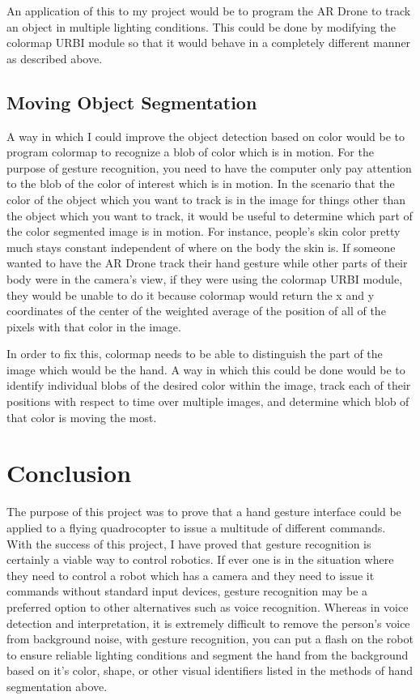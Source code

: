 \documentclass[a4paper,12pt]{report}
\begin{document}
An application of this to my project would be to program the AR Drone to track an object in multiple lighting conditions. This could be done by modifying the colormap URBI module so that it would behave in a completely different manner as described above.   
\subsection{Moving Object Segmentation}
A way in which I could improve the object detection based on color would be to program colormap to recognize a blob of color which is in motion. For the purpose of gesture recognition, you need to have the computer only pay attention to the blob of the color of interest which is in motion. In the scenario that the color of the object which you want to track is in the image for things other than the object which you want to track, it would be useful to determine which part of the color segmented image is in motion. For instance, people's skin color pretty much stays constant independent of where on the body the skin is. If someone wanted to have the AR Drone track their hand gesture while other parts of their body were in the camera's view, if they were using the colormap URBI module, they would be unable to do it because colormap would return the x and y coordinates of the center of the weighted average of the position of all of the pixels with that color in the image. 

In order to fix this, colormap needs to be able to distinguish the part of the image which would be the hand. A way in which this could be done would be to identify individual blobs of the desired color within the image, track each of their positions with respect to time over multiple images, and determine which blob of that color is moving the most. 

\section{Conclusion}

The purpose of this project was to prove that a hand gesture interface could be applied to a flying quadrocopter to issue a multitude of different commands. With the success of this project, I have proved that gesture recognition is certainly a viable way to control robotics. If ever one is in the situation where they need to control a robot which has a camera and they need to issue it commands without standard input devices, gesture recognition may be a preferred option to other alternatives such as voice recognition. Whereas in voice detection and interpretation, it is extremely difficult to remove the person's voice from background noise, with gesture recognition, you can put a flash on the robot to ensure reliable lighting conditions and segment the hand from the background based on it's color, shape, or other visual identifiers listed in the methods of hand segmentation above. 
\end{document}
